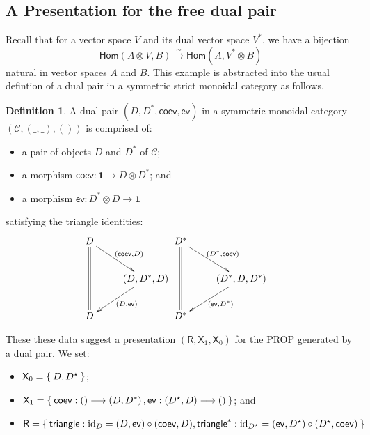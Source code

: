 \documentclass[pra,floatfix,
amsmath,superscriptaddress, 12pt]{article}
\theoremstyle{definition}
\newtheorem{defn}[thm]{Definition}
\newcommand{\liso}{\overset{\sim}{\longrightarrow}}
\newcommand{\evmap}{\mathsf{ev}}
\newcommand{\coev}{\mathsf{coev}}
\newcommand{\msf}[1]{\mathsf{#1}}
\DeclareMathOperator{\id}{{\normalfont\text{id}}}
\begin{document}
\subsection{A Presentation for the free dual pair}
Recall that for a vector space $V$ and its dual vector space $V^{*}$,
we have a bijection 
\[
\mathsf{Hom}\left(A\otimes V,B\right)\liso\mathsf{Hom}\left(A,V^{*}\otimes B\right)
\]
 natural in vector spaces $A$ and $B$. This example is abstracted
into the usual defintion of a dual pair in a symmetric strict monoidal
category as follows.
\begin{defn}
A dual pair $\left(D,D^{*},\coev,\evmap\right)$ in a symmetric monoidal
category $\left(\mathcal{C},\left(\_,\_\right),\left(\right)\right)$
is comprised of:
\begin{itemize}
\item a pair of objects $D$ and $D^{*}$ of $\mathcal{C}$;
\item a morphism $\coev:\mathbf{1}\longrightarrow D\otimes D^{*}$; and
\item a morphism $\evmap:D^{*}\otimes D\longrightarrow\mathbf{1}$
\end{itemize}
satisfying the triangle identities:
\[
\begin{split}\vcenter{\vbox{\xymatrix{D\ar@{=}[dd]\ar[dr]^{\left(\coev,D\right)}\\
 & \left(D,D^{*},D\right)\ar[dl]^{\left(D,\evmap\right)}\\
D
}
}} & \vcenter{\vbox{\xymatrix{D^{*}\ar@{=}[dd]\ar[dr]^{\left(D^{*},\coev\right)}\\
 & \left(D^{*},D,D^{*}\right)\ar[dl]^{\left(\evmap,D^{*}\right)}\\
D^{*}
}
}}\end{split}
\]
\end{defn}

These these data suggest a presentation $(\msf{R},\msf{X}_1,\msf{X}_0)$ for the \textsf{PROP}
generated by a dual pair. We set:

\begin{itemize}
    \item $\msf{X}_0 = \Set{D,D^\star}$;
    \item $\msf{X}_1 = \Set{
        \coev:\left(\right) \longrightarrow \left(D,D^{*}\right),
        \evmap:\left(D^{\star},D\right)\longrightarrow \left(\right)
    }$; and
    \item $\msf{R} =
    \Set{
        \mathsf{triangle}:\id_{D}=(D,\evmap)\circ (\coev,D),
        \mathsf{triangle}^{*}:\id_{D^\star}= (\evmap,D^\star)\circ(D^\star,\coev)
    }$
\end{itemize}
\end{document}
